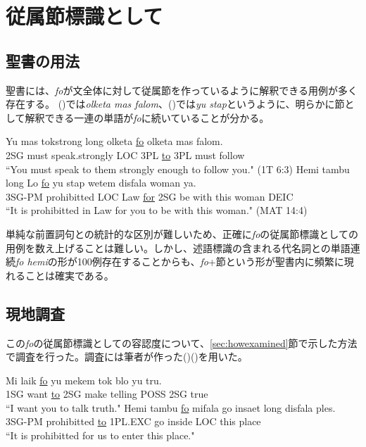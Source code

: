 \section{従属節標識として}
\subsection{聖書の用法}
聖書には、\textit{fo}が文全体に対して従属節を作っているように解釈できる用例が多く存在する。
()では\textit{olketa mas falom}、()では\textit{yu stap}というように、明らかに節として解釈できる一連の単語が\textit{fo}に続いていることが分かる。

\begin{exe}
\ex\label{ex:purposefo}
\gll Yu mas tokstrong long olketa \underline{fo} olketa mas falom.\\
2SG must speak.strongly LOC 3PL \underline{to} 3PL must follow\\
\glt ``You must speak to them strongly enough to follow you." (1T 6:3)
\ex\label{ex:tambufo}
\gll Hemi tambu long Lo \underline{fo} yu stap wetem disfala woman ya.\\
3SG-PM prohibitted LOC Law \underline{for} 2SG be with this woman DEIC\\
\glt ``It is prohibitted in Law for you to be with this woman." (MAT 14:4)
\end{exe}

単純な前置詞句との統計的な区別が難しいため、正確に\textit{fo}の従属節標識としての用例を数え上げることは難しい。しかし、述語標識の含まれる代名詞との単語連続\textit{fo hemi}の形が100例存在することからも、\textit{fo}+節という形が聖書内に頻繁に現れることは確実である。

\subsection{現地調査}\label{sec:fofield}
この\textit{fo}の従属節標識としての容認度について、\ref{sec:howexamined}節で示した方法で調査を行った。調査には筆者が作った()()を用いた。

\begin{exe}
\ex\label{ex:laikfo}
\gll Mi laik \underline{fo} yu mekem tok blo yu tru.\\
1SG want \underline{to} 2SG make telling POSS 2SG true\\
\glt ``I want you to talk truth."
\ex
\gll Hemi tambu \underline{fo} mifala go insaet long disfala ples.\\
3SG-PM prohibitted \underline{to} 1PL.EXC go inside LOC this place\\
\glt ``It is prohibitted for us to enter this place."
\end{exe}


